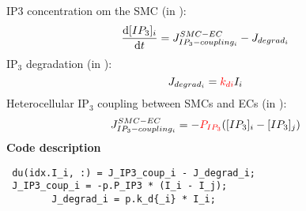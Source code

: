 \documentclass[fleqn]{report}
\numberwithin{equation}{section}
\numberwithin{equation}{section}
\begin{document}
 			\gls{IP3} concentration om the \gls{SMC} (in \uM): 
 			\begin{equation} \label{eq:dIidt}
 			\dfrac{\mathrm{d}[IP_{3}] _{i}}{\mathrm{d}t} = J^{SMC-EC}_{IP_{3}-coupling_{i}} - J_{degrad_{i}}
 			\end{equation}
 			 		IP$_{3}$ degradation (in \uMs): 
 			 		\begin{equation} \label{eq:Jdegradi}
 			 		J_{degrad_{i}}= \textcolor{red}{k_{di}}I_{i}
 			 		\end{equation}
 			 		 		Heterocellular IP$_{3}$ coupling between SMCs and ECs (in \uMs):
 			 		 		\begin{equation} \label{eq:JIP3couplingi}
 			 		 		J_{IP_{3}-coupling_{i}}^{SMC-EC}= -\textcolor{red}{P_{IP_{3}}}([IP_{3}]_{i}-[IP_{3}]_{j})
 			 		 		\end{equation}
 			 		\textbf{Code description}
\begin{verbatim}
 du(idx.I_i, :) = J_IP3_coup_i - J_degrad_i;
 J_IP3_coup_i = -p.P_IP3 * (I_i - I_j);
  		J_degrad_i = p.k_d{_i} * I_i;
\end{verbatim}
\end{document}
